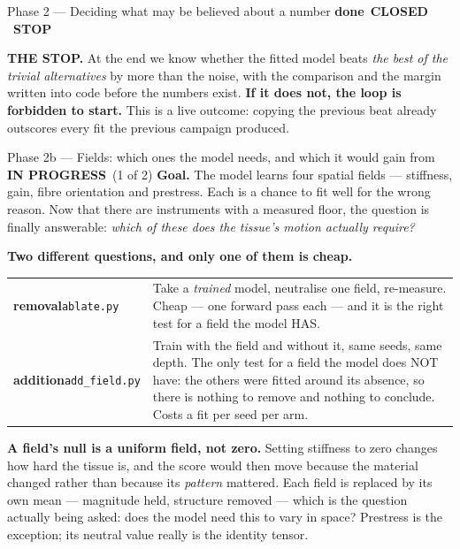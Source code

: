 \documentclass[11pt,a4paper]{article}
\newcommand{\code}[1]{\texttt{#1}}
\newcommand{\dn}{\textcolor{good}{\textbf{done}}}
\newcommand{\prog}{\textcolor{warn}{\textbf{IN PROGRESS}}}
\newcommand{\stopp}{\textcolor{bad!30!white}{\textbf{STOP}}}
\begin{document}
\begin{phasebox}{Phase 2 --- Deciding what may be believed about a number \hfill \dn\ \textbf{CLOSED} \ \stopp}
\begin{stopbox}
\textbf{THE STOP.} At the end we know whether the fitted model beats \emph{the best of the trivial
alternatives} by more than the noise, with the comparison and the margin written into code before
the numbers exist. \textbf{If it does not, the loop is forbidden to start.} This is a live outcome:
copying the previous beat already outscores every fit the previous campaign produced.
\end{stopbox}
\end{phasebox}

\begin{phasebox}{Phase 2b --- Fields: which ones the model needs, and which it would gain from \hfill \prog\ (1 of 2)}
\textbf{Goal.} The model learns four spatial fields --- stiffness, gain, fibre orientation and
prestress. Each is a chance to fit well for the wrong reason. Now that there are instruments with a
measured floor, the question is finally answerable: \emph{which of these does the tissue's motion
actually require?}

\textbf{Two different questions, and only one of them is cheap.}

\begin{center}\footnotesize
\begin{tabular}{@{}l p{10.0cm}@{}}
\toprule
\textbf{removal}\newline\code{ablate.py} & Take a \emph{trained} model, neutralise one field, re-measure.
Cheap --- one forward pass each --- and it is the right test for a field the model HAS.\\
\addlinespace
\textbf{addition}\newline\code{add\_field.py} & Train with the field and without it, same seeds, same
depth. The only test for a field the model does NOT have: the others were fitted around its absence,
so there is nothing to remove and nothing to conclude. Costs a fit per seed per arm.\\
\bottomrule
\end{tabular}
\end{center}

\textbf{A field's null is a uniform field, not zero.} Setting stiffness to zero changes how hard the
tissue is, and the score would then move because the material changed rather than because its
\emph{pattern} mattered. Each field is replaced by its own mean --- magnitude held, structure
removed --- which is the question actually being asked: does the model need this to vary in space?
Prestress is the exception; its neutral value really is the identity tensor.


\end{phasebox}
\end{document}
